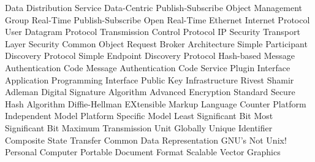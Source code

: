      {Data Distribution Service}
    {Data-Centric Publish-Subscribe}
     {Object Management Group}
    {Real-Time Publish-Subscribe}
    {Open Real-Time Ethernet}
      {Internet Protocol}
     {User Datagram Protocol}
     {Transmission Control Protocol}
   {IP Security}
     {Transport Layer Security}
   {Common Object Request Broker Architecture}
    {Simple Participant Discovery Protocol}
    {Simple Endpoint Discovery Protocol}
    {Hash-based Message Authentication Code}
     {Message Authentication Code}
     {Service Plugin Interface}
     {Application Programming Interface}
     {Public Key Infrastructure}
     {Rivest Shamir Adleman}
     {Digital Signature Algorithm}
     {Advanced Encryption Standard}
     {Secure Hash Algorithm}
      {Diffie-Hellman}
     {EXtensible Markup Language}
     {Counter}
     {Platform Independent Model}
     {Platform Specific Model}
     {Least Significant Bit}
     {Most Significant Bit}
     {Maximum Transmission Unit}
    {Globally Unique Identifier}
     {Composite State Transfer}
     {Common Data Representation}
     {GNU's Not Unix!}
      {Personal Computer}
     {Portable Document Format}
     {Scalable Vector Graphics}
